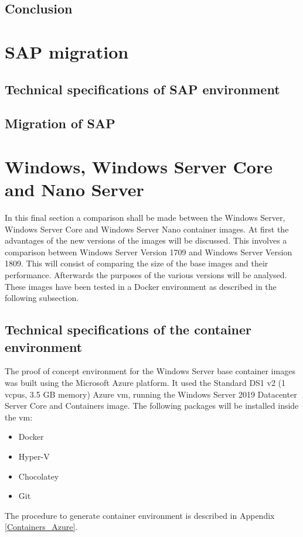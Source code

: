 \subsection{Conclusion}
\section{SAP migration}
\subsection{Technical specifications of SAP environment}
\subsection{Migration of SAP}
\section{Windows, Windows Server Core and Nano Server}
In this final section a comparison shall be made between the Windows Server, Windows Server Core and Windows Server Nano container images. At first the advantages of the new versions of the images will be discussed. This involves a comparison between Windows Server Version 1709 and Windows Server Version 1809. This will consist of comparing the size of the base images and their performance. Afterwards the purposes of the various versions will be analysed. These images have been tested in a Docker environment as described in the following subsection.

\subsection{Technical specifications of the container environment}
The proof of concept environment for the Windows Server base container images was built using the Microsoft Azure platform. It used the Standard DS1 v2 (1 vcpus, 3.5 GB memory) Azure \acrshort{vm}, running the Windows Server 2019 Datacenter Server Core and Containers image.
The following packages will be installed inside the \acrshort{vm}:
\begin{itemize}
	\item Docker
	\item Hyper-V
	\item Chocolatey
	\item Git
\end{itemize}
The procedure to generate container environment is described in Appendix \ref{Containers_Azure}.

